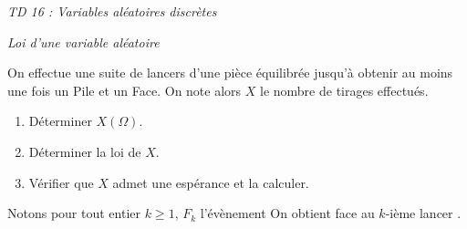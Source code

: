 \documentclass[a4paper,10pt]{report}
\begin{document}
\everymath{\displaystyle}

\begin{center}
\textit{{ {\huge TD 16 : Variables aléatoires discrètes}}}
\end{center}


\medskip

\begin{center}
\textit{{ {\large Loi d'une variable aléatoire}}}
\end{center}

\medskip

\begin{Exercice}{} On effectue une suite de lancers d'une pièce équilibrée jusqu'à obtenir au moins une fois un Pile et un Face. On note alors $X$ le nombre de tirages effectués.

\begin{enumerate}
\item Déterminer $X(\Omega)$.
\item Déterminer la loi de $X$. 
\item Vérifier que $X$ admet une espérance et la calculer.
\end{enumerate}
\end{Exercice}

\corr Notons pour tout entier $k \geq 1$, $F_k$ l'évènement \og On obtient face au $k$-ième lancer \fg .
\end{document}
